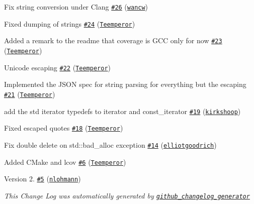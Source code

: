 \begin{DoxyItemize}
\item Fix string conversion under Clang \href{https://github.com/nlohmann/json/pull/26}{\tt \#26} (\href{https://github.com/wancw}{\tt wancw})
\item Fixed dumping of strings \href{https://github.com/nlohmann/json/pull/24}{\tt \#24} (\href{https://github.com/Teemperor}{\tt Teemperor})
\item Added a remark to the readme that coverage is G\+CC only for now \href{https://github.com/nlohmann/json/pull/23}{\tt \#23} (\href{https://github.com/Teemperor}{\tt Teemperor})
\item Unicode escaping \href{https://github.com/nlohmann/json/pull/22}{\tt \#22} (\href{https://github.com/Teemperor}{\tt Teemperor})
\item Implemented the J\+S\+ON spec for string parsing for everything but the  escaping \href{https://github.com/nlohmann/json/pull/21}{\tt \#21} (\href{https://github.com/Teemperor}{\tt Teemperor})
\item add the std iterator typedefs to iterator and const\+\_\+iterator \href{https://github.com/nlohmann/json/pull/19}{\tt \#19} (\href{https://github.com/kirkshoop}{\tt kirkshoop})
\item Fixed escaped quotes \href{https://github.com/nlohmann/json/pull/18}{\tt \#18} (\href{https://github.com/Teemperor}{\tt Teemperor})
\item Fix double delete on std\+::bad\+\_\+alloc exception \href{https://github.com/nlohmann/json/pull/14}{\tt \#14} (\href{https://github.com/elliotgoodrich}{\tt elliotgoodrich})
\item Added C\+Make and lcov \href{https://github.com/nlohmann/json/pull/6}{\tt \#6} (\href{https://github.com/Teemperor}{\tt Teemperor})
\item Version 2. \href{https://github.com/nlohmann/json/pull/5}{\tt \#5} (\href{https://github.com/nlohmann}{\tt nlohmann})
\item {\itshape This Change Log was automatically generated by \href{https://github.com/skywinder/Github-Changelog-Generator}{\tt github\+\_\+changelog\+\_\+generator}} 
\end{DoxyItemize}